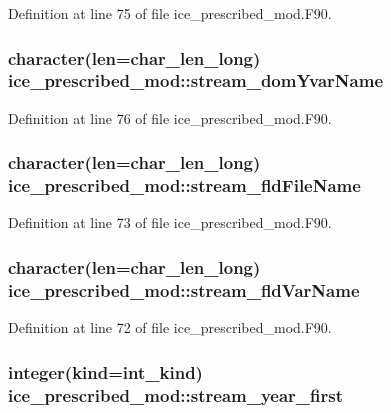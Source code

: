 Definition at line 75 of file ice\_\-prescribed\_\-mod.F90.\hypertarget{namespaceice__prescribed__mod_a38e084e4885a0dcfa51a63fbccbe05b0}{
\subsubsection[{stream\_\-domYvarName}]{\setlength{\rightskip}{0pt plus 5cm}character(len=char\_\-len\_\-long) {\bf ice\_\-prescribed\_\-mod::stream\_\-domYvarName}}}
\label{namespaceice__prescribed__mod_a38e084e4885a0dcfa51a63fbccbe05b0}


Definition at line 76 of file ice\_\-prescribed\_\-mod.F90.\hypertarget{namespaceice__prescribed__mod_a6f95de7f96b71c33ef261199631ddf80}{
\subsubsection[{stream\_\-fldFileName}]{\setlength{\rightskip}{0pt plus 5cm}character(len=char\_\-len\_\-long) {\bf ice\_\-prescribed\_\-mod::stream\_\-fldFileName}}}
\label{namespaceice__prescribed__mod_a6f95de7f96b71c33ef261199631ddf80}


Definition at line 73 of file ice\_\-prescribed\_\-mod.F90.\hypertarget{namespaceice__prescribed__mod_a345c4a3ce0fa3d2ebe4468d03a9fe51a}{
\subsubsection[{stream\_\-fldVarName}]{\setlength{\rightskip}{0pt plus 5cm}character(len=char\_\-len\_\-long) {\bf ice\_\-prescribed\_\-mod::stream\_\-fldVarName}}}
\label{namespaceice__prescribed__mod_a345c4a3ce0fa3d2ebe4468d03a9fe51a}


Definition at line 72 of file ice\_\-prescribed\_\-mod.F90.\hypertarget{namespaceice__prescribed__mod_a8ffe8edc2e99d865aa09b7c7f7801c37}{
\subsubsection[{stream\_\-year\_\-first}]{\setlength{\rightskip}{0pt plus 5cm}integer(kind=int\_\-kind) {\bf ice\_\-prescribed\_\-mod::stream\_\-year\_\-first}}}
\label{namespaceice__prescribed__mod_a8ffe8edc2e99d865aa09b7c7f7801c37}


